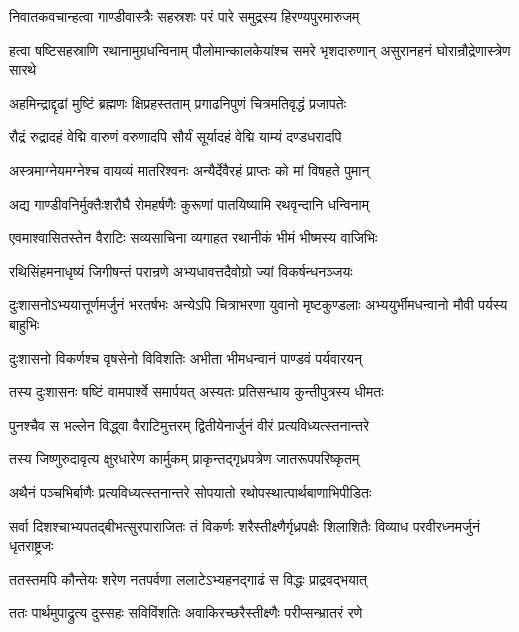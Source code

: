 \twolineshloka
{निवातकवचान्हत्वा गाण्डीवास्त्रैः सहस्रशः}
{परं पारे समुद्रस्य हिरण्यपुरमारुजम्}


\threelineshloka
{हत्वा षष्टिसहस्राणि रथानामुग्रधन्विनाम्}
{पौलोमान्कालकेयांश्च समरे भृशदारुणान्}
{असुरानहनं घोरान्रौद्रेणास्त्रेण सारथे}


\twolineshloka
{अहमिन्द्राद्दृढां मुष्टिं ब्रह्मणः क्षिप्रहस्तताम्}
{प्रगाढनिपुणं चित्रमतिवृद्धं प्रजापतेः}


\twolineshloka
{रौद्रं रुद्रादहं वेद्मि वारुणं वरुणादपि}
{सौर्यं सूर्यादहं वेद्मि याम्यं दण्डधरादपि}


\twolineshloka
{अस्त्रमाग्नेयमग्नेश्च वायव्यं मातरिश्वनः}
{अन्यैर्देवैरहं प्राप्तः को मां विषहते पुमान्}


\twolineshloka
{अद्य गाण्डीवनिर्मुक्तैःशरौघै रोमहर्षणैः}
{कुरूणां पातयिष्यामि रथवृन्दानि धन्विनाम्}



\twolineshloka
{एवमाश्वासितस्तेन वैराटिः सव्यसाचिना}
{व्यगाहत रथानीकं भीमं भीष्मस्य वाजिभिः}


\twolineshloka
{रथिसिंहमनाधृष्यं जिगीषन्तं परान्रणे}
{अभ्यधावत्तदैवोग्रो ज्यां विकर्षन्धनञ्जयः}


\onelineshloka
{दुःशासनोऽभ्ययात्तूर्णमर्जुनं भरतर्षभः}
\twolineshloka
{अन्येऽपि चित्राभरणा युवानो मृष्टकुण्डलाः}
{अभ्ययुर्भीमधन्वानो मौवी पर्यस्य बाहुभिः}


\twolineshloka
{दुःशासनो विकर्णश्च वृषसेनो विविशतिः}
{अभीता भीमधन्वानं पाण्डवं पर्यवारयन्}


\twolineshloka
{तस्य दुःशासनः षष्टिं वामपार्श्वे समार्पयत्}
{अस्यतः प्रतिसन्धाय कुन्तीपुत्रस्य धीमतः}


\twolineshloka
{पुनश्चैव स भल्लेन विद्ध्वा वैराटिमुत्तरम्}
{द्वितीयेनार्जुनं वीरं प्रत्यविध्यत्स्तनान्तरे}


\twolineshloka
{तस्य जिष्णुरुदावृत्य क्षुरधारेण कार्मुकम्}
{प्राकृन्तद्गृध्रपत्रेण जातरूपपरिष्कृतम्}


\twolineshloka
{अथैनं पञ्चभिर्बाणैः प्रत्यविध्यत्स्तनान्तरे}
{सोपयातो रथोपस्थात्पार्थबाणाभिपीडितः}


\threelineshloka
{सर्वा दिशश्चाभ्यपतद्बीभत्सुरपाराजितः}
{तं विकर्णः शरैस्तीक्ष्णैर्गृध्रपक्षैः शिलाशितैः}
{विव्याध परवीरध्नमर्जुनं धृतराष्ट्रजः}


\twolineshloka
{ततस्तमपि कौन्तेयः शरेण नतपर्वणा}
{ललाटेऽभ्यहनद्गाढं स विद्धः प्राद्रवद्भयात्}


\twolineshloka
{ततः पार्थमुपाद्रुत्य दुस्सहः सविविंशतिः}
{अवाकिरच्छरैस्तीक्ष्णैः परीप्सन्भ्रातरं रणे}


